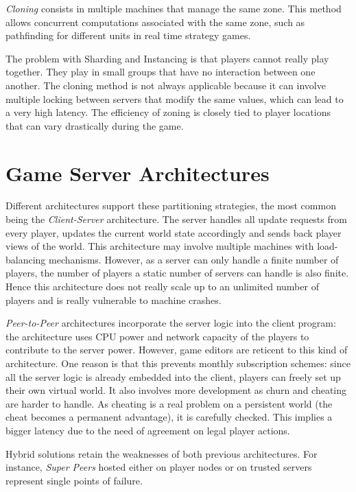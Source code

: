 \documentclass[conference]{IEEEtran}
\begin{document}
\textit{Cloning} consists in multiple machines that manage the same zone. This method allows concurrent computations associated with the same zone, such as pathfinding for different units in real time strategy games.

The problem with Sharding and Instancing is that players cannot really play together. They play in small groups that have no interaction between one another. The cloning method is not always applicable because it can involve multiple locking between servers that modify the same values, which can lead to a very high latency. The efficiency of zoning is closely tied to player locations that can vary drastically during the game.


\section{Game Server Architectures}

Different architectures support these partitioning strategies, the most common being the \textit{Client-Server} architecture. The server handles all update requests from every player, updates the current world state accordingly and sends back player views of the world. This architecture may involve multiple machines with load-balancing mechanisms. However, as a server can only handle a finite number of players, the number of players a static number of servers can handle is also finite. Hence this architecture does not really scale up to an unlimited number of players and is really vulnerable to machine crashes.

\textit{Peer-to-Peer} architectures incorporate the server logic into the client program: the architecture uses CPU power and network capacity of the players to contribute to the server power. However, game editors are reticent to this kind of architecture. One reason is that this prevents monthly subscription schemes: since all the server logic is already embedded into the client, players can freely set up their own virtual world. It also involves more development as churn and cheating are harder to handle. As cheating is a real problem on a persistent world (the cheat becomes a permanent advantage), it is carefully checked. This implies a bigger latency due to the need of agreement on legal player actions.

Hybrid solutions retain the weaknesses of both previous architectures. For instance, \textit{Super Peers} hosted either on player nodes or on trusted servers represent single points of failure.
\end{document}

